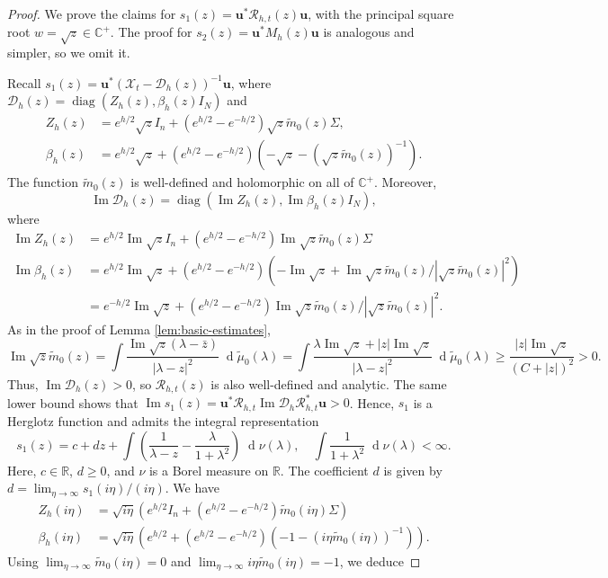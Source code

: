 \documentclass[11pt,reqno]{amsart}
\def\R{\mathbb{R}}
\def\u{\mathbf{u}}
\def\C{\mathbb{C}}
\def\cX{\mathcal{X}}
\def\cR{\mathcal{R}}
\def\cD{\mathcal{D}}
\def\de{\operatorname{d}}
\def\Im{\operatorname{Im}}
\def\diag{\operatorname{diag}}
\theoremstyle{definition}
\numberwithin{equation}{section}
\numberwithin{figure}{section}
\begin{document}
\begin{proof}
We prove the claims for $s_1(z)=\u^*\cR_{h,t}(z)\u$, with the principal square root $w=\sqrt{z}\in\C^+$. The proof for $s_2(z)=\u^*M_h(z)\u$ is analogous and simpler, so we omit it.

Recall $s_1(z)=\u^*(\cX_t-\cD_h(z))^{-1}\u$, where $\cD_h(z)=\diag(Z_h(z),\beta_h(z)I_N)$ and
\begin{align*}
    Z_h(z)&=e^{h/2}\sqrt{z}I_n
    +(e^{h/2}-e^{-h/2})\sqrt{z}\widetilde m_0(z)\Sigma,\\
    \beta_h(z)&=e^{h/2}\sqrt{z}
    +(e^{h/2}-e^{-h/2})(-\sqrt{z}-(\sqrt{z}\widetilde m_0(z))^{-1}).
\end{align*}
The function $\widetilde m_0(z)$ is well-defined and holomorphic on all of $\C^+$. Moreover,
\[
    \Im\cD_h(z)=\diag(\Im Z_h(z),\Im\beta_h(z)I_N),
\]
where
\begin{align*}
    \Im Z_h(z)&=e^{h/2}\Im \sqrt{z}I_n+(e^{h/2}-e^{-h/2})\Im \sqrt{z}\widetilde m_0(z)\Sigma\\
    \Im\beta_h(z)&=e^{h/2}\Im \sqrt{z}+(e^{h/2}-e^{-h/2})(-\Im \sqrt{z}+\Im \sqrt{z}\widetilde m_0(z)/|\sqrt{z}\widetilde m_0(z)|^2)\\
    &=e^{-h/2}\Im \sqrt{z}+(e^{h/2}-e^{-h/2})\Im \sqrt{z}\widetilde m_0(z)/|\sqrt{z}\widetilde m_0(z)|^2.
\end{align*}
As in the proof of Lemma \ref{lem:basic-estimates},
\[
    \Im \sqrt{z}\widetilde m_0(z)=\int\frac{\Im \sqrt{z}(\lambda-\bar z)}{|\lambda-z|^2}\;\de\widetilde\mu_0(\lambda)=\int\frac{\lambda\Im \sqrt{z}+|z|\Im \sqrt{z}}{|\lambda-z|^2}\;\de\widetilde\mu_0(\lambda)\geq \frac{|z|\Im \sqrt{z}}{(C+|z|)^2}>0.
\]
Thus, $\Im\cD_h(z)>0$, so $\cR_{h,t}(z)$ is also well-defined and analytic. The same lower bound shows that $\Im s_1(z)=\u^*\cR_{h,t}\Im\cD_h\cR_{h,t}^*\u>0$. Hence, $s_1$ is a Herglotz function and admits the integral representation
\[
    s_1(z)=c+dz+\int\left(\frac{1}{\lambda-z}-\frac{\lambda}{1+\lambda^2}\right)\;\de\nu(\lambda),\quad \int\frac{1}{1+\lambda^2}\;\de\nu(\lambda)<\infty.
\]
Here, $c\in\R$, $d\geq0$, and $\nu$ is a Borel measure on $\R$. The coefficient $d$ is given by $d=\lim_{\eta\rightarrow\infty}s_1(i\eta)/(i\eta)$. We have
\begin{align*}
    Z_h(i\eta)&=\sqrt{i\eta}(e^{h/2}I_n+(e^{h/2}-e^{-h/2})\widetilde m_0(i\eta)\Sigma)\\
    \beta_h(i\eta)&=\sqrt{i\eta}(e^{h/2}+(e^{h/2}-e^{-h/2})(-1-(i\eta\widetilde m_0(i\eta))^{-1})).
\end{align*}
Using $\lim_{\eta\rightarrow\infty}\widetilde m_0(i\eta)=0$ and $\lim_{\eta\rightarrow\infty}i\eta\widetilde m_0(i\eta)=-1$, we deduce

\end{proof}
\end{document}
